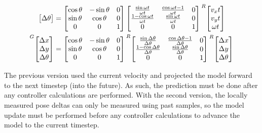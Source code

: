 \begin{align*}
{\begin{bmatrix}
    \Delta \theta
  \end{bmatrix}} &=
  \begin{bmatrix}
    \cos\theta & -\sin\theta & 0 \\
    \sin\theta &  \cos\theta & 0 \\
             0 &           0 & 1
  \end{bmatrix}
  \begin{bmatrix}
    \frac{\sin\omega t}{\omega t} & \frac{\cos\omega t - 1}{\omega t} & 0 \\
    \frac{1 - \cos\omega t}{\omega t} & \frac{\sin\omega t}{\omega t} & 0 \\
    0 & 0 & 1
  \end{bmatrix}
  \prescript{R}{}{\begin{bmatrix}
    v_x t \\
    v_y t \\
    \omega t
  \end{bmatrix}} \\
  \prescript{G}{}{\begin{bmatrix}
    \Delta x \\
    \Delta y \\
    \Delta \theta
  \end{bmatrix}} &=
  \begin{bmatrix}
    \cos\theta & -\sin\theta & 0 \\
    \sin\theta &  \cos\theta & 0 \\
             0 &           0 & 1
  \end{bmatrix}
  \prescript{R}{}{\begin{bmatrix}
    \frac{\sin\Delta\theta}{\Delta\theta} &
      \frac{\cos\Delta\theta - 1}{\Delta\theta} & 0 \\
    \frac{1 - \cos\Delta\theta}{\Delta\theta} &
      \frac{\sin\Delta\theta}{\Delta\theta} & 0 \\
    0 & 0 & 1
  \end{bmatrix}}
  \prescript{R}{}{\begin{bmatrix}
    \Delta x \\
    \Delta y \\
    \Delta\theta
  \end{bmatrix}}
\end{align*}

The previous version used the current velocity and projected the model forward
to the next timestep (into the future). As such, the prediction must be done
after any controller calculations are performed. With the second version, the
locally measured pose deltas can only be measured using past samples, so the
model update must be performed before any controller calculations to advance the
model to the current timestep.

